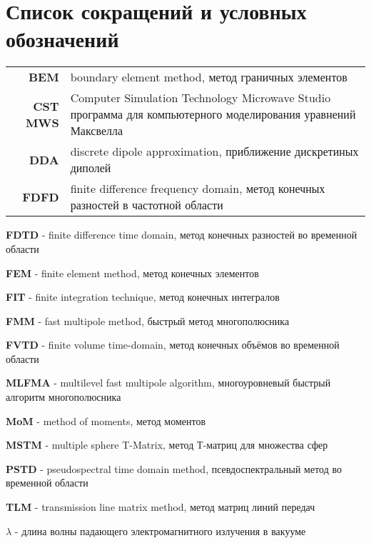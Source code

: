 \chapter*{Список сокращений и условных обозначений}             %
\noindent
\begin{tabularx}{\textwidth}{r X}
  \textbf{BEM} & boundary element method, метод граничных элементов\\
  \textbf{CST MWS} & Computer Simulation Technology Microwave Studio
  программа для компьютерного моделирования уравнений Максвелла\\
  \textbf{DDA} & discrete dipole approximation, приближение дискретиных диполей\\
  \textbf{FDFD} & finite difference frequency domain, метод конечных
  разностей в частотной области\\
\end{tabularx}
\textbf{FDTD} - finite difference time domain, метод конечных
разностей во временной области

\textbf{FEM} - finite element method,  метод конечных элементов

\textbf{FIT} - finite integration technique, метод конечных интегралов

\textbf{FMM} - fast multipole method, быстрый метод многополюсника

\textbf{FVTD} - finite volume time-domain, метод конечных объёмов во
временной области

\textbf{MLFMA} - multilevel fast multipole algorithm, многоуровневый
быстрый алгоритм многополюсника

\textbf{MoM} - method of moments, метод моментов

\textbf{MSTM} - multiple sphere T-Matrix, метод Т-матриц для множества сфер

\textbf{PSTD} - pseudospectral time domain method, псевдоспектральный
метод во временной области 

\textbf{TLM} - transmission line matrix method, метод матриц линий передач
 

\boldmath$\lambda$ - длина волны падающего электромагнитного излучения
в вакууме